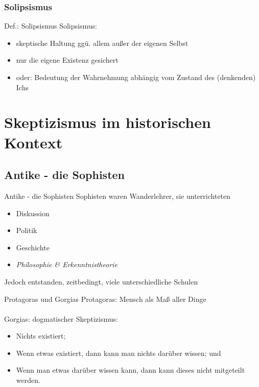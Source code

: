 \documentclass[12pt]{beamer}
\begin{document}
\subsubsection{Solipsismus}
\begin{frame}{Def.: Solipsismus}
Solipsismus:
\begin{itemize}
\item skeptische Haltung ggü. allem außer der eigenen Selbst
\item nur die eigene Existenz gesichert
\item oder: Bedeutung der Wahrnehmung abhängig vom Zustand des (denkenden) Ichs %
\end{itemize}
\end{frame}

\section{Skeptizismus im historischen Kontext}
\subsection{Antike - die Sophisten} %
\begin{frame}{Antike - die Sophisten}
Sophisten waren Wanderlehrer, sie unterrichteten
\begin{itemize}
\item Diskussion
\item Politik
\item Geschichte
\item \emph{Philosophie \& Erkenntnistheorie}
\end{itemize}
Jedoch entstanden, zeitbedingt, viele unterschiedliche Schulen
\end{frame}

\begin{frame}{Protagoras und Gorgias}
Protagoras: Mensch als Maß aller Dinge\\%
\ \\
Gorgias: dogmatischer Skeptizismus:
\begin{itemize}
\item Nichts existiert;
\item Wenn etwas existiert, dann kann man nichts darüber wissen; und
\item Wenn man etwas darüber wissen kann, dann kann dieses nicht mitgeteilt werden.%
\end{itemize}
\end{frame}
\end{document}
